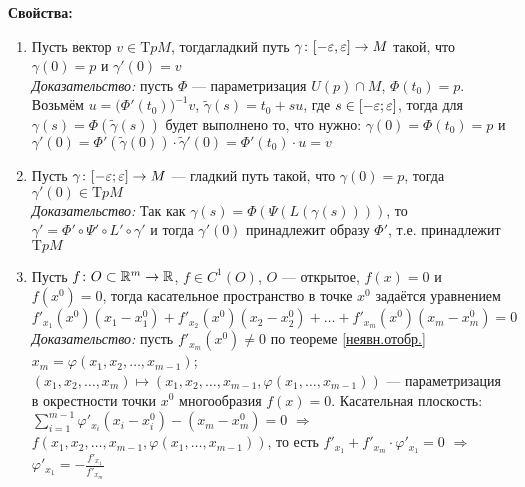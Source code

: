 \textbf{Свойства:}
\begin{enumerate}
	\item Пусть вектор $v \in \mathrm TpM$, тогда\E  гладкий путь $\gamma \colon [-\varepsilon, \varepsilon] \to M$ такой, что $\gamma(0) = p$ и $\gamma'(0) = v$\\[3pt]
	\textit{Доказательство:} пусть $\varPhi$ --- параметризация $U(p) \cap M$, $\varPhi(t_0) = p$. Возьмём $u = \bigl(\varPhi'(t_0)\bigr)^{-1}v$\linebreak{}, $\widetilde{\gamma}(s) = t_0 + su$, где $s \in [-\varepsilon; \varepsilon]$, тогда для $\gamma(s) = \varPhi(\widetilde{\gamma}(s))$ будет выполнено то, что нужно: $\gamma(0) = \varPhi(t_0) = p$ и $\gamma'(0) = \varPhi'(\widetilde{\gamma}(0)) \cdot \widetilde{\gamma}'(0) = \varPhi'(t_0) \cdot u = v$
	
	\item Пусть $\gamma \colon [-\varepsilon; \varepsilon] \to M$ --- гладкий путь такой, что $\gamma(0) = p$, тогда $\gamma'(0) \in \mathrm TpM$\\[3pt]
	\textit{Доказательство:} Так как $\gamma(s) = \varPhi(\Psi(L(\gamma(s))))$, то $\gamma' = \varPhi' \circ \Psi' \circ L' \circ \gamma'$ и тогда $\gamma'(0)$ принадлежит образу $\varPhi'$, т.е. принадлежит $\mathrm TpM$
	
	\item {}Пусть $f \colon O \subset \mathbb R^m \to \mathbb R$, $f \in C^1(O)$, $O$ --- открытое, $f(x) = 0$ и $f(x^0) = 0$, тогда касательное пространство в точке $x^0$ задаётся уравнением \[f'_{x_1}(x^0)(x_1 - x_1^0) + f'_{x_2}(x^0)(x_2 - x_2^0) + \ldots + f'_{x_m}(x^0)(x_m - x_m^0) = 0\]
	\textit{Доказательство:} пусть $f'_{x_m}(x^0) \ne 0$ по теореме \ref{неявн.отобр.} $x_m = \varphi(x_1, x_2, \ldots, x_{m - 1})$; $(x_1, x_2, \ldots, x_m) \mapsto (x_1, x_2, \ldots, x_{m-1}, \varphi(x_1, \ldots, x_{m- 1 }))$ --- параметризация в окрестности точки $x^0$ многообразия $f(x) = 0$.
	Касательная плоскость: $\sum\limits_{i = 1}^{m - 1} \varphi'_{x_i}(x_i - x^0_i) - (x_m - x^0_m) = 0$ $\Rightarrow$ $f(x_1, x_2, \ldots, x_{m - 1}, \varphi(x_1, \ldots, x_{m-1}))$, то есть $f'_{x_1} + f'_{x_m} \cdot \varphi'_{x_1} = 0$ $\Rightarrow$ $\varphi'_{x_1} = -\frac{f'_{x_1}}{f'_{x_m}}$
\end{enumerate}